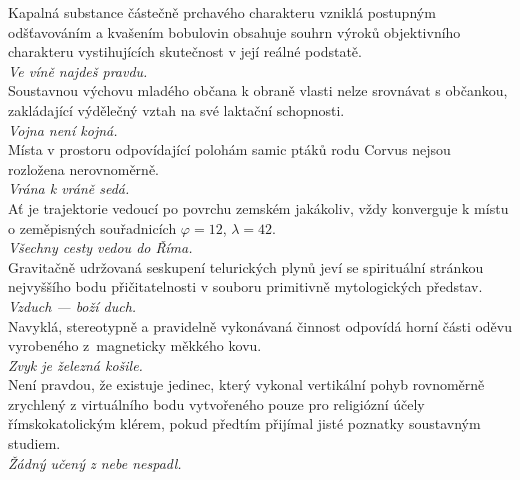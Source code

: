 \begin{multicols}{2}
\noindent
Kapalná substance částečně prchavého charakteru vzniklá postupným
odšťavováním a kvašením bobulovin obsahuje souhrn výroků objektivního
charakteru vystihujících skutečnost v její reálné podstatě.\\[1 mm]
{\sl Ve víně najdeš pravdu.}\\

\noindent
Soustavnou výchovu mladého občana k obraně vlasti nelze srovnávat
s občankou, zakládající výdělečný vztah na své laktační schopnosti.\\[1 mm]
{\sl Vojna není kojná.}\\

\noindent
Místa v prostoru odpovídající polohám samic ptáků rodu Corvus
nejsou rozložena nerovnoměrně.\\[1 mm]
{\sl Vrána k vráně sedá.}\\

\noindent
Ať je trajektorie vedoucí po povrchu zemském jakákoliv, vždy
konverguje k místu o zeměpisných souřadnicích $\varphi = 12$,
$\lambda = 42$.\\[1 mm]
{\sl Všechny cesty vedou do Říma.}\\

\noindent
Gravitačně udržovaná seskupení telurických plynů jeví se
spirituální stránkou nejvyššího bodu přičitatelnosti v souboru
primitivně mytologických představ.\\[1 mm]
{\sl Vzduch --- boží duch.}\\

\noindent
Navyklá, stereotypně a pravidelně vykonávaná činnost odpovídá
horní části oděvu vyrobeného z~magneticky měkkého kovu.\\[1 mm]
{\sl Zvyk je železná košile.}\\

\noindent
Není pravdou, že existuje jedinec, který vykonal vertikální pohyb
rovnoměrně zrychlený z virtuálního bodu vytvořeného pouze pro religiózní
účely římskokatolickým klérem, pokud předtím přijímal jisté poznatky
soustavným studiem.\\[1 mm]
{\sl Žádný učený z nebe nespadl.}\\

\end{multicols}
\clearpage

